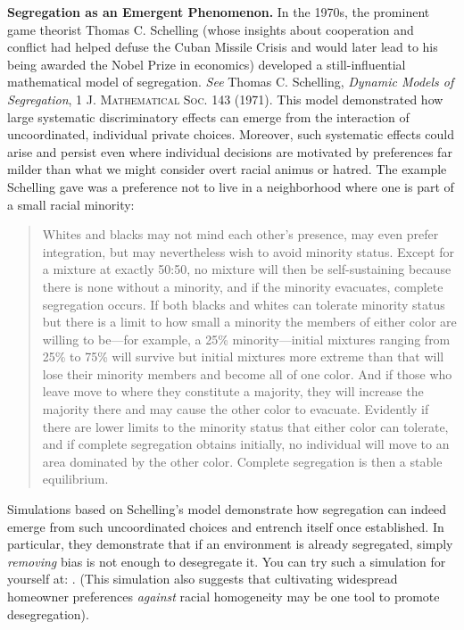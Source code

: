 \begin{questions}[]
\item \textbf{Segregation as an Emergent Phenomenon.} In the 1970s, the
prominent game theorist Thomas C. Schelling (whose insights about cooperation
and conflict had helped defuse the Cuban Missile Crisis and would later lead to
his being awarded the Nobel Prize in economics) developed a still-influential
mathematical model of segregation. \textit{See} Thomas C. Schelling,
\textit{Dynamic Models of Segregation}, 1 \textsc{J. Mathematical Soc.} 143
(1971). This model demonstrated how large systematic discriminatory effects can
emerge from the interaction of uncoordinated, individual private choices.
Moreover, such systematic effects could arise and persist even where individual
decisions are motivated by preferences far milder than what we might consider
overt racial animus or hatred. The example Schelling gave was a preference not
to live in a neighborhood where one is part of a small racial minority:
\begin{quote}
Whites and blacks may not mind each other's presence, may even prefer
integration, but may nevertheless wish to avoid minority status. Except for a
mixture at exactly 50:50, no mixture will then be self-sustaining because there
is none without a minority, and if the minority evacuates, complete segregation
occurs. If both blacks and whites can tolerate minority status but there is a
limit to how small a minority the members of either color are willing to
be---for example, a 25\% minority---initial mixtures ranging from 25\% to 75\%
will survive but initial mixtures more extreme than that will lose their
minority members and become all of one color. And if those who leave move to
where they constitute a majority, they will increase the majority there and may
cause the other color to evacuate. Evidently if there are lower limits to the
minority status that either color can tolerate, and if complete segregation
obtains initially, no individual will move to an area dominated by the other
color. Complete segregation is then a stable equilibrium.
\end{quote}

Simulations based on Schelling's model demonstrate how segregation can indeed
emerge from such uncoordinated choices and entrench itself once established. In
particular, they demonstrate that if an environment is already segregated,
simply \textit{removing} bias is not enough to desegregate it. You can try such
a simulation for yourself at: . (This
simulation also suggests that cultivating widespread homeowner preferences
\textit{against} racial homogeneity may be one tool to promote desegregation). 



\end{questions}
